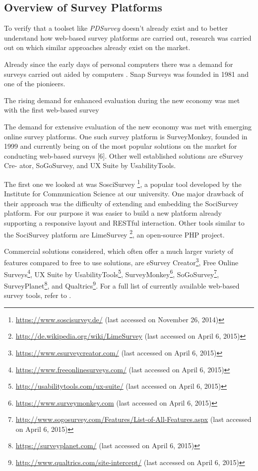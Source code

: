 





	\subsection{Overview of Survey Platforms}
	To verify that a toolset like \textit{PDSurvey} doesn't already exist and to better understand how web-based survey platforms are carried out, research was carried out on which similar approaches already exist on the market. 



Already since the early days of personal computers there was a demand for surveys carried out aided by computers \cite{SnapSurveys2015AboutUs}. Snap Surveys was founded in 1981 and one of the pionieers.

The rising demand for enhanced evaluation during the new economy was met with the first web-based survey 

The demand for extensive evaluation of the new economy was met with emerging online survey platforms. One such survey platform is SurveyMonkey, founded in 1999 and currently being on of the most popular solutions on the market for conducting web-based surveys [6]. Other well established solutions are eSurvey Cre- ator, SoGoSurvey, and UX Suite by UsabilityTools.



	The first one we looked at was SosciSurvey \footnote{\url{https://www.soscisurvey.de/} (last accessed on November 26, 2014)}, a popular tool developed by the Institute for Communication Science at our university. One major drawback of their approach was the difficulty of extending and embedding the SociSurvey platform. For our purpose it was easier to build a new platform already supporting a responsive layout and RESTful interaction. Other tools similar to the SociSurvey platform are LimeSurvey \footnote{\url{http://de.wikipedia.org/wiki/LimeSurvey} (last accessed on April 6, 2015)}, an open-source PHP project.

	Commercial solutions considered, which often offer a much larger variety of features compared to free to use solutions, are eSurvey Creator\footnote{\url{https://www.esurveycreator.com/} (last accessed on April 6, 2015)}, Free Online Surveys\footnote{\url{https://www.freeonlinesurveys.com/} (last accessed on April 6, 2015)}, UX Suite by UsabilityTools\footnote{\url{http://usabilitytools.com/ux-suite/} (last accessed on April 6, 2015)}, SurveyMonkey\footnote{\url{https://www.surveymonkey.com} (last accessed on April 6, 2015)}, SoGoSurvey\footnote{\url{http://www.sogosurvey.com/Features/List-of-All-Features.aspx} (last accessed on April 6, 2015)}, SurveyPlanet\footnote{\url{https://surveyplanet.com/} (last accessed on April 6, 2015)}, and Qualtrics\footnote{\url{http://www.qualtrics.com/site-intercept/} (last accessed on April 6, 2015)}. For a full list of currently available web-based survey tools, refer to \cite{Capterra2015SurveyTools, Idealware2011SurveyTools}.

